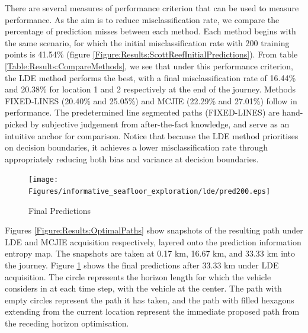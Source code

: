 \documentclass{article}
\begin{document}
		  				
		There are several measures of performance criterion that can be used to measure performance. As the aim is to reduce misclassification rate, we compare the percentage of prediction misses between each method. Each method begins with the same scenario, for which the initial misclassification rate with 200 training points is 41.54\% (figure \ref{Figure:Results:ScottReefInitialPredictions}). From table \ref{Table:Results:CompareMethods}, we see that under this performance criterion, the LDE method performs the best, with a final misclassification rate of 16.44\% and 20.38\% for location 1 and 2 respectively at the end of the journey. Methods FIXED-LINES (20.40\% and 25.05\%) and MCJIE (22.29\% and 27.01\%) follow in performance. The predetermined line segmented paths (FIXED-LINES) are hand-picked by subjective judgement from after-the-fact knowledge, and serve as an intuitive anchor for comparison. Notice that because the LDE method prioritises on decision boundaries, it achieves a lower misclassification rate through appropriately reducing both bias and variance at decision boundaries.
	
		\begin{figure}[!htbp]
		\centering
			\texttt{[image: Figures/informative\_seafloor\_exploration/lde/pred200.eps]}
		\caption{Final Predictions}
		\label{Figure:Results:FinalPredictions}
		\end{figure}
				
		Figures \ref{Figure:Results:OptimalPaths} show snapshots of the resulting path under LDE and MCJIE acquisition respectively, layered onto the prediction information entropy map. The snapshots are taken at 0.17 km, 16.67 km, and 33.33 km into the journey. Figure \ref{Figure:Results:FinalPredictions} shows the final predictions after 33.33 km under LDE acquisition. The circle represents the horizon length for which the vehicle considers in at each time step, with the vehicle at the center. The path with empty circles represent the path it has taken, and the path with filled hexagons extending from the current location represent the immediate proposed path from the receding horizon optimisation.
		
\end{document}
